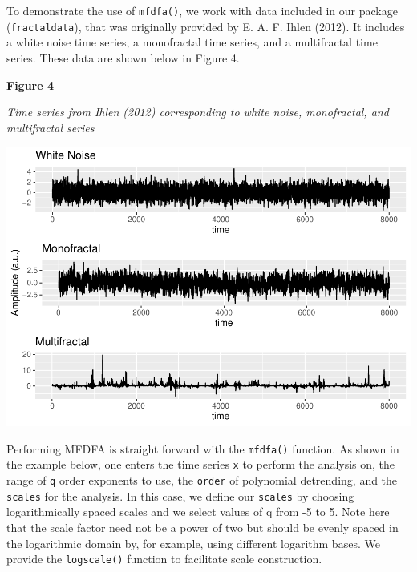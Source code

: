 \documentclass[
  man]{apa6}
\begin{document}
To demonstrate the use of \texttt{mfdfa()}, we work with data included in our
package (\texttt{fractaldata}), that was originally provided by
E. A. F. Ihlen (2012). It includes a white noise
time series, a monofractal time series, and a multifractal time series.
These data are shown below in Figure 4.

\textbf{Figure 4}

\emph{Time series from Ihlen (2012) corresponding to white noise,
monofractal, and multifractal series}

\includegraphics{fractal_regression_paper_brm_files/figure-latex/unnamed-chunk-9-1.pdf}

Performing MFDFA is straight forward with the \texttt{mfdfa()} function. As
shown in the example below, one enters the time series \texttt{x} to perform
the analysis on, the range of \texttt{q} order exponents to use, the \texttt{order} of
polynomial detrending, and the \texttt{scales} for the analysis. In this case,
we define our \texttt{scales} by choosing logarithmically spaced scales and we
select values of q from -5 to 5. Note here that the scale factor need
not be a power of two but should be evenly spaced in the logarithmic
domain by, for example, using different logarithm bases. We provide the
\texttt{logscale()} function to facilitate scale construction.
\end{document}
